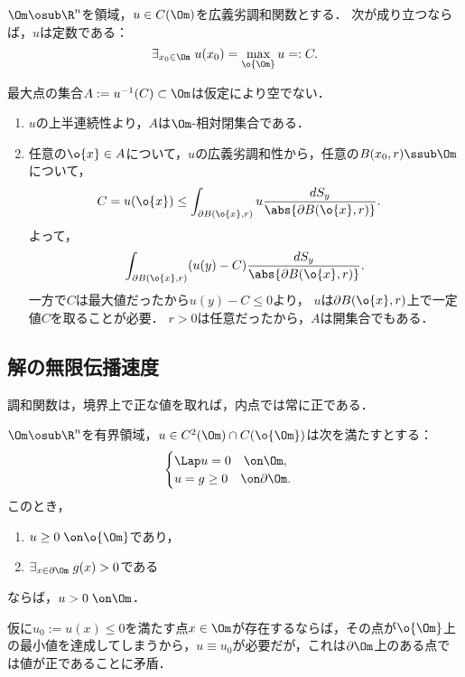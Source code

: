 \documentclass[uplatex,dvipdfmx]{jsreport}
\begin{document}
\begin{theorem}
    $\Om\osub\R^n$を領域，$u\in C(\Om)$を広義劣調和関数とする．
    次が成り立つならば，$u$は定数である：
    \[\exists_{x_0\in\Om}\;u(x_0)=\max_{\o{\Om}} u=:C.\]
\end{theorem}
\begin{Proof}
    最大点の集合$A:=u^{-1}(C)\subset\Om$は仮定により空でない．
    \begin{enumerate}
        \item $u$の上半連続性より，$A$は$\Om$-相対閉集合である．
        \item 任意の$\o{x}\in A$について，$u$の広義劣調和性から，任意の$B(x_0,r)\ssub\Om$について，
        \begin{align*}
            C=u(\o{x})&\le\int_{\partial B(\o{x},r)}u\frac{dS_y}{\abs{\partial B(\o{x},r)}}.
        \end{align*}
        よって，
        \[\int_{\partial B(\o{x},r)}(u(y)-C)\frac{dS_y}{\abs{\partial B(\o{x},r)}}.\]
        一方で$C$は最大値だったから$u(y)-C\le0$より，
        $u$は$\partial B(\o{x},r)$上で一定値$C$を取ることが必要．
        $r>0$は任意だったから，$A$は開集合でもある．
    \end{enumerate}
\end{Proof}

\subsection{解の無限伝播速度}

\begin{tcolorbox}[colframe=ForestGreen, colback=ForestGreen!10!white,breakable,colbacktitle=ForestGreen!40!white,coltitle=black,fonttitle=\bfseries\sffamily,
    title=比較原理：解作用素は正作用素である]
    調和関数は，境界上で正な値を取れば，内点では常に正である．
\end{tcolorbox}

\begin{theorem}[比較原理]\label{thm-comparison-principle}
    $\Om\osub\R^n$を有界領域，$u\in C^2(\Om)\cap C(\o{\Om})$は次を満たすとする：
    \[\begin{cases}
        \Lap u=0\quad\on \Om,\\
        u=g\ge0\quad\on\partial \Om.
    \end{cases}\]
    このとき，
    \begin{enumerate}
        \item $u\ge0\;\on\o{\Om}$であり，
        \item $\exists_{x\in\partial\Om}\;g(x)>0$である
    \end{enumerate}
    ならば，$u>0\;\on\Om$．
\end{theorem}
\begin{Proof}
    仮に$u_0:=u(x)\le 0$を満たす点$x\in\Om$が存在するならば，その点が$\o{\Om}$上の最小値を達成してしまうから，$u\equiv u_0$が必要だが，これは$\partial\Om$上のある点では値が正であることに矛盾．
\end{Proof}
\end{document}
